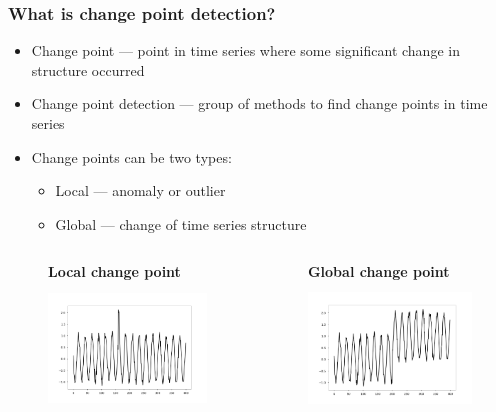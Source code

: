 \documentclass[intlimits, 9pt, unicode]{beamer}
\begin{document}
\begin{frame}
    \frametitle{What is change point detection?}

    \begin{itemize}
    	\item Change point --- point in time series where some significant change in structure occurred
	\item Change point detection --- group of methods to find change points in time series
	\item Change points can be two types:
		\begin{itemize}
			\item Local --- anomaly or outlier
			\item Global --- change of time series structure 
		\end{itemize}
    \end{itemize}

    {\begin{columns}
        \begin{column}{5cm}
        \begin{figure}
        \centering 
	\textbf{Local change point}
        \includegraphics[height=3.5cm]{images/local_cp}
	\end{figure}
        \end{column}

        \begin{column}{5cm}
	\begin{figure}
    	\centering
	\textbf{Global change point}
        \includegraphics[height=3.5cm]{images/global_cp}
	\end{figure}
        \end{column}
    \end{columns}}
    
\end{frame}
\end{document}
